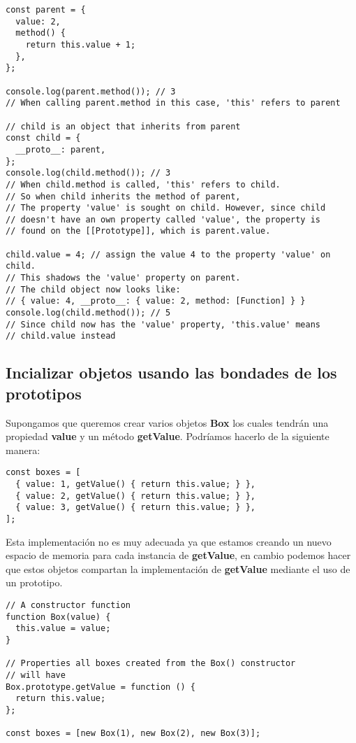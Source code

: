\documentclass{article}
\begin{document}
\begin{lstlisting}
const parent = {
  value: 2,
  method() {
    return this.value + 1;
  },
};

console.log(parent.method()); // 3
// When calling parent.method in this case, 'this' refers to parent

// child is an object that inherits from parent
const child = {
  __proto__: parent,
};
console.log(child.method()); // 3
// When child.method is called, 'this' refers to child.
// So when child inherits the method of parent,
// The property 'value' is sought on child. However, since child
// doesn't have an own property called 'value', the property is
// found on the [[Prototype]], which is parent.value.

child.value = 4; // assign the value 4 to the property 'value' on child.
// This shadows the 'value' property on parent.
// The child object now looks like:
// { value: 4, __proto__: { value: 2, method: [Function] } }
console.log(child.method()); // 5
// Since child now has the 'value' property, 'this.value' means
// child.value instead

\end{lstlisting}

\subsection{Incializar objetos usando las bondades de los prototipos}

Supongamos que queremos crear varios objetos \textbf{Box} los cuales tendrán una propiedad \textbf{value} y un método
\textbf{getValue}. Podríamos hacerlo de la siguiente manera:

\begin{lstlisting}
const boxes = [
  { value: 1, getValue() { return this.value; } },
  { value: 2, getValue() { return this.value; } },
  { value: 3, getValue() { return this.value; } },
];
\end{lstlisting}

Esta implementación no es muy adecuada ya que estamos creando un nuevo espacio de memoria para cada instancia
de \textbf{getValue}, en cambio podemos hacer que estos objetos compartan la implementación de \textbf{getValue}
mediante el uso de un prototipo.

\begin{lstlisting}
// A constructor function
function Box(value) {
  this.value = value;
}

// Properties all boxes created from the Box() constructor
// will have
Box.prototype.getValue = function () {
  return this.value;
};

const boxes = [new Box(1), new Box(2), new Box(3)];
\end{lstlisting}
\end{document}
